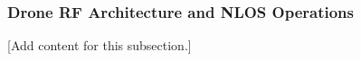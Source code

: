 
\subsubsection{Drone RF Architecture and NLOS Operations}
\label{subsubsec:design_5_6_drone_rf_architecture_nlos}

[Add content for this subsection.]
